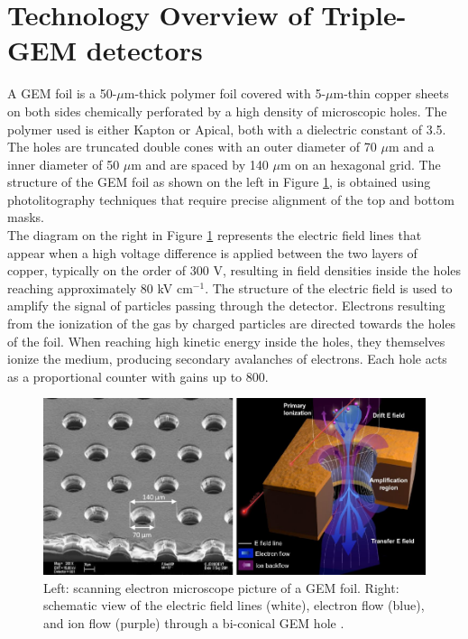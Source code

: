   \section{Technology Overview of Triple-GEM detectors}

    A GEM foil is a 50-$\mu$m-thick polymer foil covered with 5-$\mu$m-thin copper sheets on both sides chemically perforated by a high density of microscopic holes. The polymer used is either Kapton or Apical, both with a dielectric constant of 3.5. The holes are truncated double cones with an outer diameter of 70 $\mu$m and a inner diameter of 50 $\mu$m and are spaced by 140 $\mu$m on an hexagonal grid. The structure of the GEM foil as shown on the left in Figure \ref{fig:II-1-holes}, is obtained using photolitography techniques that require precise alignment of the top and bottom masks. \\

    The diagram on the right in Figure \ref{fig:II-1-holes} represents the electric field lines that appear when a high voltage difference is applied between the two layers of copper, typically on the order of 300 V, resulting in field densities inside the holes reaching approximately 80 kV cm$^{-1}$. The structure of the electric field is used to amplify the signal of particles passing through the detector. Electrons resulting from the ionization of the gas by charged particles are directed towards the holes of the foil. When reaching high kinetic energy inside the holes, they themselves ionize the medium, producing secondary avalanches of electrons. Each hole acts as a proportional counter with gains up to 800.  \\

    \begin{figure}[h!]
      \centering
      \includegraphics[width=\textwidth]{img/II-1-gem/holes.pdf}
      \caption{Left: scanning electron microscope picture of a GEM foil. Right: schematic view of the electric field lines (white), electron flow (blue), and ion flow (purple) through a bi-conical GEM hole \cite{Colaleo:2021453}.}
      \label{fig:II-1-holes}
    \end{figure}

